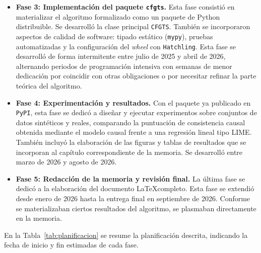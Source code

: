 \documentclass[12pt]{report} %
\begin{document}
\begin{itemize}
    \item \textbf{Fase 3: Implementación del paquete \texttt{cfgts}.} Esta fase consistió en materializar el algoritmo formalizado como un paquete de Python distribuible. Se desarrolló la clase principal \texttt{CFGTS}. También se incorporaron aspectos de calidad de software: tipado estático (\texttt{mypy}), pruebas automatizadas y la configuración del \textit{wheel} con \texttt{Hatchling}. Esta fase se desarrolló de forma intermitente entre julio de 2025 y abril de 2026, alternando periodos de programación intensiva con semanas de menor dedicación por coincidir con otras obligaciones o por necesitar refinar la parte teórica del algoritmo.

    \item \textbf{Fase 4: Experimentación y resultados.} Con el paquete ya publicado en \texttt{PyPI}, esta fase se dedicó a diseñar y ejecutar experimentos sobre conjuntos de datos sintéticos y reales, comparando la puntuación de consistencia causal obtenida mediante el modelo causal frente a una regresión lineal tipo LIME. También incluyó la elaboración de las figuras y tablas de resultados que se incorporan al capítulo correspondiente de la memoria. Se desarrolló entre marzo de 2026 y agosto de 2026.

    \item \textbf{Fase 5: Redacción de la memoria y revisión final.} La última fase se dedicó a la elaboración del documento \LaTeX completo. Esta fase se extendió desde enero de 2026 hasta la entrega final en septiembre de 2026. Conforme se materializaban ciertos resultados del algoritmo, se plasmaban directamente en la memoria.
\end{itemize}

En la Tabla~\ref{tab:planificacion} se resume la planificación descrita, indicando la fecha de inicio y fin estimadas de cada fase.
\end{document}

